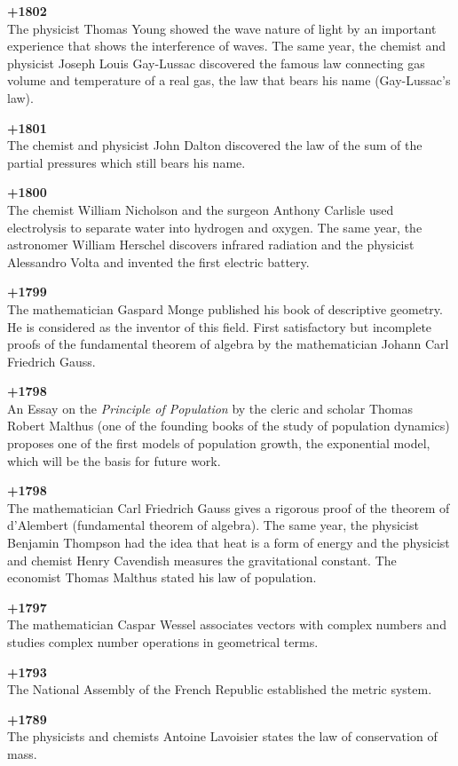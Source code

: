 \textbf{+1802}\\
The physicist Thomas Young showed the wave nature of light by an important experience that shows the interference of waves. The same year, the chemist and physicist Joseph Louis Gay-Lussac discovered the famous law connecting gas volume and temperature of a real gas, the law that bears his name (Gay-Lussac's law).

\textbf{+1801}\\
The chemist and physicist John Dalton discovered the law of the sum of the partial pressures which still bears his name.

\textbf{+1800}\\
The chemist William Nicholson and the surgeon Anthony Carlisle used electrolysis to separate water into hydrogen and oxygen. The same year, the astronomer William Herschel discovers infrared radiation and the physicist Alessandro Volta and invented the first electric battery.

\textbf{+1799}\\
The mathematician Gaspard Monge published his book of descriptive geometry. He is considered as the inventor of this field. First satisfactory but incomplete proofs of the fundamental theorem of algebra by the mathematician Johann Carl Friedrich Gauss.

\textbf{+1798}\\
An Essay on the \textit{Principle of Population} by the cleric and scholar Thomas Robert Malthus (one of the founding books of the study of population dynamics) proposes one of the first models of population growth, the exponential model, which will be the basis for future work.

\textbf{+1798}\\
The mathematician Carl Friedrich Gauss gives a rigorous proof of the theorem of d'Alembert (fundamental theorem of algebra). The same year, the physicist Benjamin Thompson had the idea that heat is a form of energy and the physicist and chemist Henry Cavendish measures the gravitational constant. The economist Thomas Malthus stated his law of population.

\textbf{+1797}\\
The mathematician Caspar Wessel associates vectors with complex numbers and studies complex number operations in geometrical terms.

\textbf{+1793}\\
The National Assembly of the French Republic established the metric system.

\textbf{+1789}\\
The physicists and chemists Antoine Lavoisier states the law of conservation of mass.

